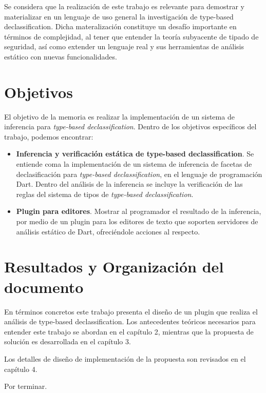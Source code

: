 \begin{intro}
	Se considera que la realización de este trabajo es relevante para demostrar y materializar en un lenguaje de uso general la investigación de type-based declassification. Dicha materalización constituye un desafío importante en términos de complejidad, al tener que entender la teoría subyacente de tipado de seguridad, así como extender un lenguaje real y sus herramientas de análisis estático con nuevas funcionalidades.

		\section{Objetivos}
	El objetivo de la memoria es realizar la implementación de un sistema de inferencia para \textit{type-based declassification}. Dentro de los objetivos específicos del trabajo, podemos encontrar:

	\begin{itemize}
	\item \textbf{Inferencia y verificación estática de type-based declassification}. Se entiende coma la implementación de un sistema de inferencia de facetas de declasificación para \textit{type-based declassification}, en el lenguaje de programación Dart. Dentro del análisis de la inferencia se incluye la verificación de las reglas del sistema de tipos de \textit{type-based declassification}.

	\item \textbf{Plugin para editores}. Mostrar al programador el resultado de la inferencia, por medio de un plugin para los editores de texto que soporten servidores de análisis estático de Dart, ofreciéndole acciones al respecto.

	\end{itemize}

		\section{Resultados y Organización del documento}

	En términos concretos este trabajo presenta el diseño de un plugin que realiza el análisis de type-based declassification. Los antecedentes teóricos necesarios para entender este trabajo se abordan en el capítulo 2, mientras que la propuesta de solución es desarrollada en el capítulo 3.

	Los detalles de diseño de implementación de la propuesta son revisados en el capítulo 4.

	Por terminar.


\end{intro}
